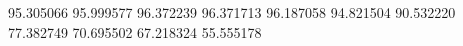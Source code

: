 95.305066
95.999577
96.372239
96.371713
96.187058
94.821504
90.532220
77.382749
70.695502
67.218324
55.555178
